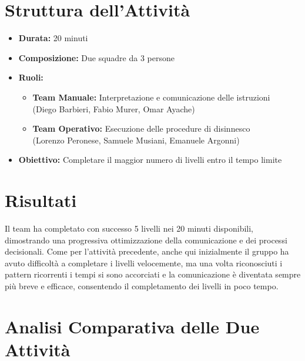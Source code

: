 \documentclass{article}
\begin{document}
\section*{Struttura dell'Attività}
\begin{itemize}
    \item \textbf{Durata:} 20 minuti
    \item \textbf{Composizione:} Due squadre da 3 persone
    \item \textbf{Ruoli:}
    \begin{itemize}
        \item \textbf{Team Manuale:} Interpretazione e comunicazione delle istruzioni\\
        (Diego Barbieri, Fabio Murer, Omar Ayache)
        \item \textbf{Team Operativo:} Esecuzione delle procedure di disinnesco\\
        (Lorenzo Peronese, Samuele Musiani, Emanuele Argonni)
    \end{itemize}
    \item \textbf{Obiettivo:} Completare il maggior numero di livelli entro il tempo limite
\end{itemize}

\section*{Risultati}
Il team ha completato con successo 5 livelli nei 20 minuti disponibili, dimostrando una progressiva ottimizzazione della comunicazione e dei processi decisionali.
Come per l'attività precedente, anche qui inizialmente il gruppo ha avuto difficoltà a completare i livelli velocemente, ma una volta riconosciuti i pattern ricorrenti i tempi si sono accorciati e la comunicazione è diventata sempre più breve e efficace, consentendo il completamento dei livelli in poco tempo.

\section*{Analisi Comparativa delle Due Attività}
\end{document}
